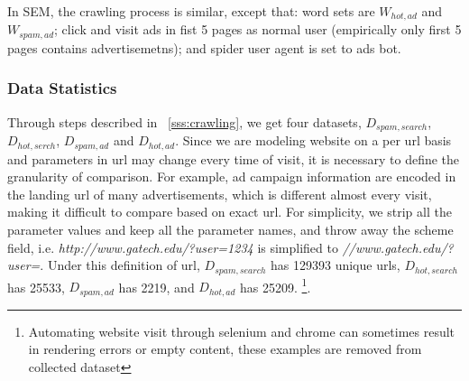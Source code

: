 In SEM, the crawling process is similar, except that: word sets are
$W_{hot, ad}$ and $W_{spam, ad}$; click and visit ads in fist 5 pages as normal
user (empirically only first 5 pages contains advertisemetns); 
and spider user agent is set to ads bot.

\subsubsection{Data Statistics}
Through steps described in ~\autoref{sss:crawling}, we get four datasets,
$D_{spam, search}$, $D_{hot, serch}$, $D_{spam, ad}$ and $D_{hot, ad}$.
Since we are modeling website on a per url basis and parameters in url may
change every time of visit, it is necessary to define the granularity of
comparison. For example, ad campaign information are encoded in the landing url of many 
advertisements, which is different almost every visit, making it difficult to
compare based on exact url.
For simplicity, we strip all the parameter
values and keep all the parameter names, and throw away the scheme field, i.e.
{\it http://www.gatech.edu/?user=1234} is simplified to
{\it //www.gatech.edu/?user=}. Under this definition of url, $D_{spam, search}$
has 129393 unique urls, $D_{hot, search}$ has 25533, $D_{spam, ad}$ has 2219,
and $D_{hot, ad}$ has 25209.
\footnote{Automating website visit through selenium
  and chrome can sometimes result in rendering errors or empty content, these
examples are removed from collected dataset}.


%

